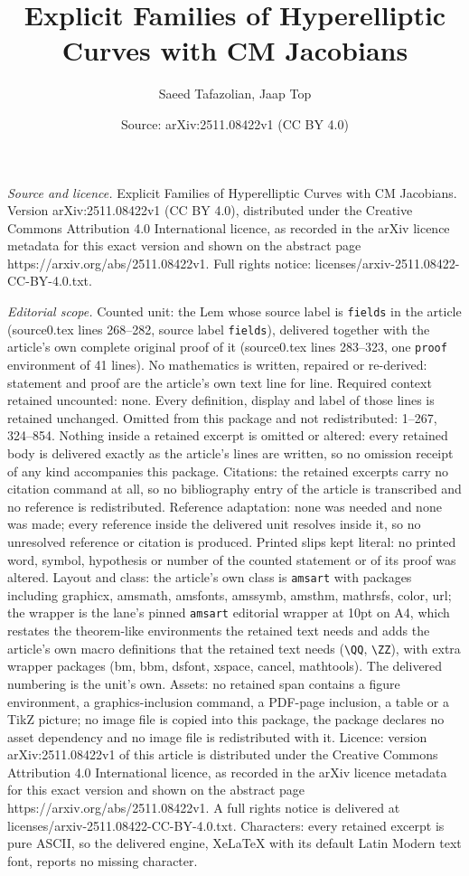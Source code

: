 \documentclass[10pt,a4paper]{amsart}
\title[Explicit Families of Hyperelliptic Curves with CM Jacobians]{Explicit Families of Hyperelliptic Curves with CM Jacobians}
\author{Saeed Tafazolian, Jaap Top}
\date{Source: arXiv:2511.08422v1 (CC BY 4.0)}
\begin{document}
\maketitle

\noindent\emph{Source and licence.} Explicit Families of Hyperelliptic Curves with CM Jacobians. Version arXiv:2511.08422v1 (CC BY 4.0), distributed under the Creative Commons Attribution 4.0 International licence, as recorded in the arXiv licence metadata for this exact version and shown on the abstract page https://arxiv.org/abs/2511.08422v1. Full rights notice: licenses/arxiv-2511.08422-CC-BY-4.0.txt.\par\smallskip

\noindent\textit{Editorial scope.} Counted unit: the Lem whose source label is \texttt{fields} in the article (source0.tex lines 268--282, source label \texttt{fields}), delivered together with the article's own complete original proof of it (source0.tex lines 283--323, one \texttt{proof} environment of 41 lines). No mathematics is written, repaired or re-derived: statement and proof are the article's own text line for line. Required context retained uncounted: none. Every definition, display and label of those lines is retained unchanged. Omitted from this package and not redistributed: 1--267, 324--854. Nothing inside a retained excerpt is omitted or altered: every retained body is delivered exactly as the article's lines are written, so no omission receipt of any kind accompanies this package. Citations: the retained excerpts carry no citation command at all, so no bibliography entry of the article is transcribed and no reference is redistributed. Reference adaptation: none was needed and none was made; every reference inside the delivered unit resolves inside it, so no unresolved reference or citation is produced. Printed slips kept literal: no printed word, symbol, hypothesis or number of the counted statement or of its proof was altered. Layout and class: the article's own class is \texttt{amsart} with packages including graphicx, amsmath, amsfonts, amssymb, amsthm, mathrsfs, color, url; the wrapper is the lane's pinned \texttt{amsart} editorial wrapper at 10pt on A4, which restates the theorem-like environments the retained text needs and adds the article's own macro definitions that the retained text needs (\texttt{\textbackslash QQ}, \texttt{\textbackslash ZZ}), with extra wrapper packages (bm, bbm, dsfont, xspace, cancel, mathtools). The delivered numbering is the unit's own. Assets: no retained span contains a figure environment, a graphics-inclusion command, a PDF-page inclusion, a table or a TikZ picture; no image file is copied into this package, the package declares no asset dependency and no image file is redistributed with it. Licence: version arXiv:2511.08422v1 of this article is distributed under the Creative Commons Attribution 4.0 International licence, as recorded in the arXiv licence metadata for this exact version and shown on the abstract page https://arxiv.org/abs/2511.08422v1. A full rights notice is delivered at licenses/arxiv-2511.08422-CC-BY-4.0.txt. Characters: every retained excerpt is pure ASCII, so the delivered engine, XeLaTeX with its default Latin Modern text font, reports no missing character.
\end{document}
